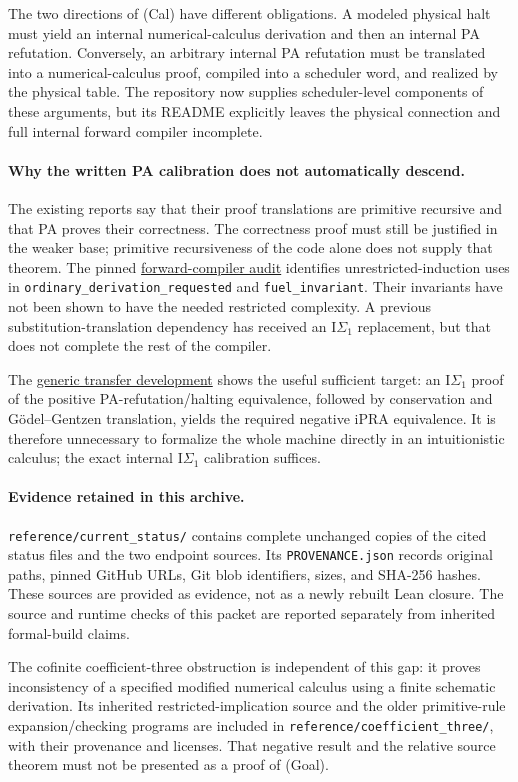 The two directions of (Cal) have different obligations. A modeled
physical halt must yield an internal numerical-calculus derivation and
then an internal PA refutation. Conversely, an arbitrary internal PA
refutation must be translated into a numerical-calculus proof, compiled
into a scheduler word, and realized by the physical table. The repository
now supplies scheduler-level components of these arguments, but its
README explicitly leaves the physical connection and full internal
forward compiler incomplete.

\paragraph{Why the written PA calibration does not automatically descend.}
The existing reports say that their proof translations are primitive
recursive and that PA proves their correctness. The correctness proof
must still be justified in the weaker base; primitive recursiveness of
the code alone does not supply that theorem. The pinned
\href{https://github.com/VladimirReshetnikov/ProveIt/blob/1c9524d8bf2e0a27b9a16ff622359927f536e663/Computability/BusyBeaver/Research/PA/pa194-forward-audit/README.md}{forward-compiler audit}
identifies unrestricted-induction uses in
\texttt{ordinary\_derivation\_requested} and
\texttt{fuel\_invariant}. Their invariants have not been shown to have
the needed restricted complexity. A previous substitution-translation
dependency has received an $\mathrm{I}\Sigma_1$ replacement, but that
does not complete the rest of the compiler.

The
\href{https://github.com/VladimirReshetnikov/ProveIt/blob/1c9524d8bf2e0a27b9a16ff622359927f536e663/Computability/BusyBeaver/Research/PA/isigma1-transfer/README.md}{generic transfer development}
shows the useful sufficient target: an $\mathrm{I}\Sigma_1$ proof of
the positive PA-refutation/halting equivalence, followed by conservation
and G\"odel--Gentzen translation, yields the required negative iPRA
equivalence. It is therefore unnecessary to formalize the whole machine
directly in an intuitionistic calculus; the exact internal
$\mathrm{I}\Sigma_1$ calibration suffices.

\paragraph{Evidence retained in this archive.}
\texttt{reference/current\_status/} contains complete unchanged copies
of the cited status files and the two endpoint sources. Its
\texttt{PROVENANCE.json} records original paths, pinned GitHub URLs,
Git blob identifiers, sizes, and SHA-256 hashes. These sources are provided
as evidence, not as a newly rebuilt Lean closure. The source and runtime
checks of this packet are reported separately from inherited formal-build
claims.

The cofinite coefficient-three obstruction is independent of this gap:
it proves inconsistency of a specified modified numerical calculus using
a finite schematic derivation. Its inherited restricted-implication source
and the older primitive-rule expansion/checking programs are included in
\texttt{reference/coefficient\_three/}, with their provenance and licenses.
That negative result and the relative source theorem must not be
presented as a proof of (Goal).
